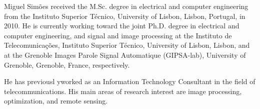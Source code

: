 \documentclass[10pt,twocolumn,twoside]{IEEEtran}
\begin{document}




%

%


\begin{IEEEbiography}{Miguel Sim\~{o}es}
	received the M.Sc. degree in electrical and computer engineering from the Instituto Superior T\'{e}cnico, University of Lisbon, Lisbon, Portugal, in 2010. He is currently working toward the joint Ph.D. degree in electrical and computer engineering, and signal and image processing at the Instituto de Telecomunica\c{c}\~{o}es, Instituto Superior T\'{e}cnico, University of Lisbon, Lisbon, and at the Grenoble Images Parole Signal Automatique (GIPSA-lab), University of Grenoble, Grenoble, France, respectively.

	He has previousl yworked as an Information Technology Consultant in the field of telecommunications. His main areas of research interest are image processing, optimization, and remote sensing.
\end{IEEEbiography}
\end{document}
